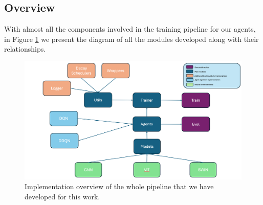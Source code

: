 \subsection{Overview}
\label{sec:overview_implementation}

With almost all the components involved in the training pipeline for our agents, in Figure \ref{fig:implementationoverview} we present the diagram of all the modules developed along with their relationships. 

\begin{figure}[!h]
	\centering
	\includegraphics[width=0.7\linewidth]{figures/implementation_everview}
	\caption{Implementation overview of the whole pipeline that we have developed for this work.}
	\label{fig:implementationoverview}
\end{figure}


